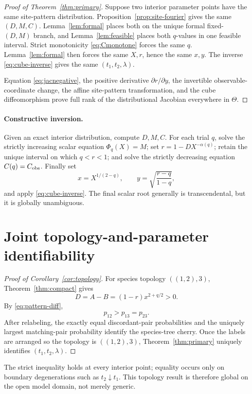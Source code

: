 \documentclass[11pt]{article}
\newcommand{\Thetao}{\Theta}
\begin{document}
\begin{proof}[Proof of Theorem~\ref{thm:primary}]
Suppose two interior parameter points have the same site-pattern distribution.  Proposition~\ref{prop:site-fourier} gives the same $(D,M,C)$.  Lemma~\ref{lem:formal} places both on the unique formal fixed-$(D,M)$ branch, and Lemma~\ref{lem:feasible} places both $q$-values in one feasible interval.  Strict monotonicity \eqref{eq:Cmonotone} forces the same $q$.  Lemma~\ref{lem:formal} then forces the same $X,r$, hence the same $x,y$.  The inverse \eqref{eq:cube-inverse} gives the same $(t_1,t_2,\lambda)$.

Equation \eqref{eq:jacnegative}, the positive derivative $\partial r/\partial y$, the invertible observable-coordinate change, the affine site-pattern transformation, and the cube diffeomorphism prove full rank of the distributional Jacobian everywhere in $\Thetao$.
\end{proof}

\paragraph{Constructive inversion.}
Given an exact interior distribution, compute $D,M,C$.  For each trial $q$, solve the strictly increasing scalar equation $\Phi_q(X)=M$; set $r=1-DX^{-\alpha(q)}$; retain the unique interval on which $q<r<1$; and solve the strictly decreasing equation $C(q)=C_{\rm obs}$.  Finally set
\[
x=X^{1/(2-q)},\qquad y=\sqrt{\frac{r-q}{1-q}},
\]
and apply \eqref{eq:cube-inverse}.  The final scalar root generally is transcendental, but it is globally unambiguous.

\section{Joint topology-and-parameter identifiability}\label{sec:topology}

\begin{proof}[Proof of Corollary~\ref{cor:topology}]
For species topology $((1,2),3)$, Theorem~\ref{thm:compact} gives
\[
D=A-B=(1-r)x^{2+q/2}>0.
\]
By \eqref{eq:pattern-diff},
\[
p_{12}>p_{13}=p_{23}.
\]
After relabeling, the exactly equal discordant-pair probabilities and the uniquely largest matching-pair probability identify the species-tree cherry.  Once the labels are arranged so the topology is $((1,2),3)$, Theorem~\ref{thm:primary} uniquely identifies $(t_1,t_2,\lambda)$.
\end{proof}

The strict inequality holds at every interior point; equality occurs only on boundary degenerations such as $t_2\downarrow t_1$.  This topology result is therefore global on the open model domain, not merely generic.
\end{document}
